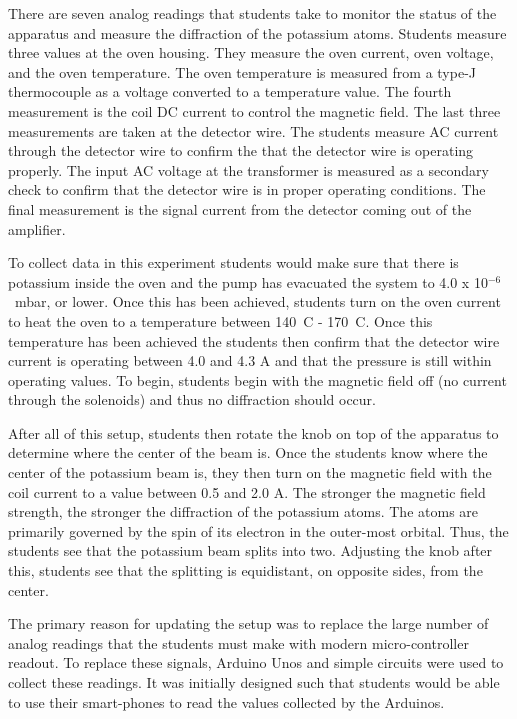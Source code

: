 There are seven analog readings that students take to monitor the status of the apparatus and measure the diffraction of the potassium atoms.
Students measure three values at the oven housing.
They measure the oven current, oven voltage, and the oven temperature.
The oven temperature is measured from a type-J thermocouple as a voltage converted to a temperature value.
The fourth measurement is the coil DC current to control the magnetic field.
The last three measurements are taken at the detector wire.
The students measure AC current through the detector wire to confirm the that the detector wire is operating properly.
The input AC voltage at the transformer is measured as a secondary check to confirm that the detector wire is in proper operating conditions.
The final measurement is the signal current from the detector coming out of the amplifier.

To collect data in this experiment students would make sure that there is potassium inside the oven and the pump has evacuated the system to 4.0 x 10$^{-6}$~mbar, or lower.
Once this has been achieved, students turn on the oven current to heat the oven to a temperature between 140\textdegree~C - 170\textdegree~C.
Once this temperature has been achieved the students then confirm that the detector wire current is operating between 4.0 and 4.3 A and that the pressure is still within operating values.
To begin, students begin with the magnetic field off (no current through the solenoids) and thus no diffraction should occur.

After all of this setup, students then rotate the knob on top of the apparatus to determine where the center of the beam is.
Once the students know where the center of the potassium beam is, they then turn on the magnetic field with the coil current to a value between 0.5 and 2.0 A.
The stronger the magnetic field strength, the stronger the diffraction of the potassium atoms.
The atoms are primarily governed by the spin of its electron in the outer-most orbital.
Thus, the students see that the potassium beam splits into two.
Adjusting the knob after this, students see that the splitting is equidistant, on opposite sides, from the center.

The primary reason for updating the setup was to replace the large number of analog readings that the students must make with modern micro-controller readout.
To replace these signals, Arduino Unos and simple circuits were used to collect these readings.
It was initially designed such that students would be able to use their smart-phones to read the values collected by the Arduinos.

